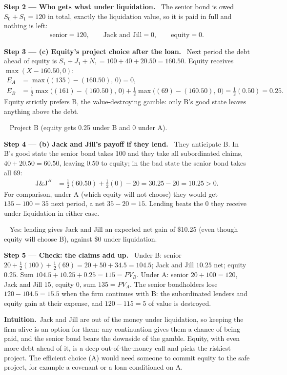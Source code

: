 \documentclass[11pt,a4paper]{article}
\newcommand{\step}[2]{\par\medskip\noindent\textbf{Step #1 --- #2.}~}
\newcommand{\intuition}{\par\medskip\noindent\textbf{Intuition.}~}
\newcommand{\answer}[1]{\par\smallskip\noindent\fbox{\textbf{Answer #1.}}~}
\begin{document}
\step{2}{Who gets what under liquidation} The senior bond is owed $S_0+S_1=120$ in total, exactly the liquidation value, so it is paid in full and nothing is left:
\begin{align}
  \text{senior} = 120, \qquad \text{Jack and Jill} = 0, \qquad \text{equity} = 0. \nonumber
\end{align}

\step{3}{(c) Equity's project choice after the loan} Next period the debt ahead of equity is $S_1+J_1+N_1=100+40+20.50=160.50$. Equity receives $\max(X-160.50,0)$:
\begin{align}
  E_A &= \max\bigl((135)-(160.50),\,0\bigr) = 0, \nonumber\\
  E_B &= \tfrac12\max\bigl((161)-(160.50),\,0\bigr) + \tfrac12\max\bigl((69)-(160.50),\,0\bigr) = \tfrac12(0.50) = 0.25. \nonumber
\end{align}
Equity strictly prefers B, the value-destroying gamble: only B's good state leaves anything above the debt.
\answer{(c)} Project B (equity gets 0.25 under B and 0 under A).

\step{4}{(b) Jack and Jill's payoff if they lend} They anticipate B. In B's good state the senior bond takes 100 and they take all subordinated claims, $40+20.50=60.50$, leaving $0.50$ to equity; in the bad state the senior bond takes all 69:
\begin{align}
  \text{J\&J}^{B} &= \tfrac12(60.50) + \tfrac12(0) - 20 = 30.25 - 20 = 10.25 > 0. \nonumber
\end{align}
For comparison, under A (which equity will not choose) they would get $135-100=35$ next period, a net $35-20=15$. Lending beats the $0$ they receive under liquidation in either case.
\answer{(b)} Yes: lending gives Jack and Jill an expected net gain of \$10.25 (even though equity will choose B), against \$0 under liquidation.

\step{5}{Check: the claims add up} Under B: senior $20+\tfrac12(100)+\tfrac12(69)=20+50+34.5=104.5$; Jack and Jill $10.25$ net; equity $0.25$. Sum $104.5+10.25+0.25=115=PV_B$. Under A: senior $20+100=120$, Jack and Jill $15$, equity $0$, sum $135=PV_A$. The senior bondholders lose $120-104.5=15.5$ when the firm continues with B: the subordinated lenders and equity gain at their expense, and $120-115=5$ of value is destroyed.

\intuition Jack and Jill are out of the money under liquidation, so keeping the firm alive is an option for them: any continuation gives them a chance of being paid, and the senior bond bears the downside of the gamble. Equity, with even more debt ahead of it, is a deep out-of-the-money call and picks the riskiest project. The efficient choice (A) would need someone to commit equity to the safe project, for example a covenant or a loan conditioned on A.
\end{document}
